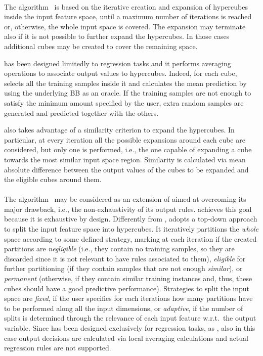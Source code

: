 \documentclass[
]{ceurart}
\begin{document}
\paragraph{\iter}

The \iter{} algorithm~\cite{huysmans2006iter} is based on the iterative creation and expansion of hypercubes inside the input feature space, until a maximum number of iterations is reached or, otherwise, the whole input space is covered.
%
The expansion may terminate also if it is not possible to further expand the hypercubes.
%
In those cases additional cubes may be created to cover the remaining space.

\iter{} has been designed limitedly to regression tasks and it performs averaging operations to associate output values to hypercubes.
%
Indeed, for each cube, \iter{} selects all the training samples inside it and calculates the mean prediction by using the underlying BB as an oracle.
%
If the training samples are not enough to satisfy the minimum amount specified by the user, extra random samples are generated and predicted together with the others.

\iter{} also takes advantage of a similarity criterion to expand the hypercubes.
%
In particular, at every iteration all the possible expansions around each cube are considered, but only one is performed, i.e., the one capable of expanding a cube towards the most similar input space region.
%
Similarity is calculated via mean absolute difference between the output values of the cubes to be expanded and the eligible cubes around them.

\paragraph{\gridex{}}

The \gridex algorithm~\cite{gridex-extraamas2021} may be considered as an extension of \iter{} aimed at overcoming its major drawback, i.e., the non-exhaustivity of its output rules.
%
\gridex{} achieves this goal because it is exhaustive by design.
%
Differently from \iter{}, \gridex{} adopts a top-down approach to split the input feature space into hypercubes.
%
It iteratively partitions the \emph{whole} space according to some defined strategy, marking at each iteration if the created partitions are \emph{negligible} (i.e., they contain no training samples, so they are discarded since it is not relevant to have rules associated to them), \emph{eligible} for further partitioning (if they contain samples that are not enough \emph{similar}), or \emph{permanent} (otherwise, if they contain similar training instances and, thus, these cubes should have a good predictive performance).
%
Strategies to split the input space are \emph{fixed}, if the user specifies for each iterations how many partitions have to be performed along all the input dimensions, or \emph{adaptive}, if the number of splits is determined through the relevance of each input feature w.r.t.\ the output variable.
%
Since \gridex{} has been designed exclusively for regression tasks, as \iter{}, also in this case output decisions are calculated via local averaging calculations and actual regression rules are not supported.
\end{document}
